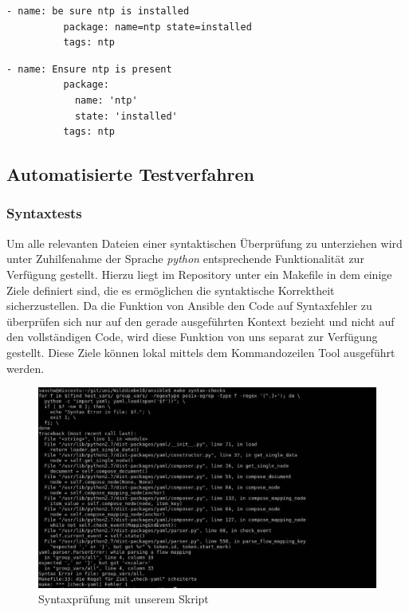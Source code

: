 \begin{minipage}{\textwidth}
\begin{lstlisting}[label=code:ansiblebpbad,caption=Formatierung nach Standard]
        - name: be sure ntp is installed
          package: name=ntp state=installed
          tags: ntp
\end{lstlisting}
\end{minipage}

\begin{lstlisting}[label=code:ansiblebpgood,caption=Unsere verwendete Formatierung]
        - name: Ensure ntp is present
          package:
            name: 'ntp'
            state: 'installed'
          tags: ntp
\end{lstlisting}

\subsection{Automatisierte Testverfahren}
\subsubsection{Syntaxtests}
Um alle relevanten Dateien einer syntaktischen Überprüfung zu unterziehen wird unter Zuhilfenahme der Sprache \emph{python} entsprechende Funktionalität zur Verfügung gestellt. Hierzu liegt im Repository unter  ein Makefile in dem einige Ziele definiert sind, die es ermöglichen die syntaktische Korrektheit sicherzustellen. Da die Funktion von Ansible den Code auf Syntaxfehler zu überprüfen sich nur auf den gerade ausgeführten Kontext bezieht und nicht auf den vollständigen Code, wird diese Funktion von uns separat zur Verfügung gestellt. Diese Ziele können lokal mittels dem Kommandozeilen Tool  ausgeführt werden.

\begin{figure}[!htbp]
	\centering
		\includegraphics[scale=0.75]{images/syntaxchecks.jpg} 
	\caption{Syntaxprüfung mit unserem Skript}
	\label{img:syntaxcheck}
\end{figure}


